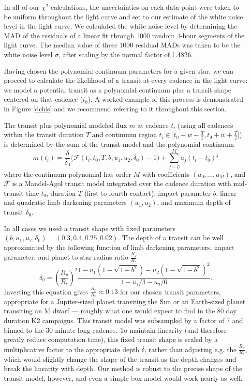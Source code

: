 \documentclass[twocolumn]{aastex62}
\begin{document}
In all of our $\chi^2$ calculations, the uncertainties on each data
point were taken to be uniform throughout the light curve and set to
our estimate of the white noise level in the light curve. We
calculated the white noise level by determining the MAD of the
residuals of a linear fit through 1000 random 4-hour segments of the
light curve.  The median value of these 1000 residual MADs was taken
to be the white noise level $\sigma$, after scaling by the normal
factor of 1.4826.

Having chosen the polynomial continuum parameters for a given star, we
can proceed to calculate the likelihood of a transit at every cadence
in the light curve: we model a potential transit as a polynomial
continuum plus a transit shape centered on that cadence ($t_0$). A
worked example of this process is demonstrated in Figure \ref{dchis}
and we recommend referring to it throughout this section.

The transit plus polynomial modeled flux $m$ at cadence $t_i$ (using
all cadences within the transit duration $T$ and continuum region $t_i
\in \Big[ t_0 - w - \frac{T}{2}, t_0 + w + \frac{T}{2} \Big]$) is
determined by the sum of the transit model and the polynomial
continuum
\begin{equation} \label{chi2model}
m(t_i) = \frac{\delta}{\delta_0} \Big(\mathcal{F}\left(t_i,t_0, T,
b,u_1,u_2,\delta_0\right)-1\Big) + \sum_{j=0}^M a_j (t_i-t_0)^j
\end{equation}
where the continuum polynomial has order $M$ with coefficients $(a_0,
..., a_M)$, and $\mathcal{F}$ is a Mandel-Agol transit model
integrated over the cadence duration with mid-transit time $t_0$,
duration $T$ (first to fourth contact), impact parameter $b$, linear
and quadratic limb darkening parameters $(u_1,u_2)$, and maximum depth
of transit $\delta_0$.

In all cases we used a transit shape with fixed parameters
$(b,u_1,u_2,\delta_0) = (0.3,0.4,0.25,0.02)$.  The depth of a transit
can be well approximated by the following function of limb darkening
parameters, impact parameter, and planet to star radius ratio
$\frac{R_p}{R_*}$
\begin{equation}
\delta_0 =
\left(\frac{R_p}{R_*}\right)^2\frac{1-u_1(1-\sqrt{1-b^2})-u_2(1-\sqrt{1-b^2})^2}{1-u_1/3-u_2/6}.
\end{equation}
Inverting this equation gives $\frac{R_p}{R_*} \approx 0.13$ for our
chosen transit parameters, appropriate for a Jupiter-sized planet
transiting the Sun or an Earth-sized planet transiting an M dwarf ---
roughly what one would expect to find in the 80 day duration K2
campaigns.  This transit model was subsampled by a factor of 7
  and binned to the 30 minute long cadence. To maintain linearity
(and therefore greatly reduce computation time), this fixed transit
shape is scaled by a multiplicative factor to the appropriate depth
$\delta$, rather than adjusting e.g. the $\frac{R_p}{R_*}$, which
would slightly change the shape of the transit as the depth changes
and break the linearity with depth.  Our method is robust to the
precise shape of the transit model, however, and even a simple box
model would work nearly as well.
\end{document}
